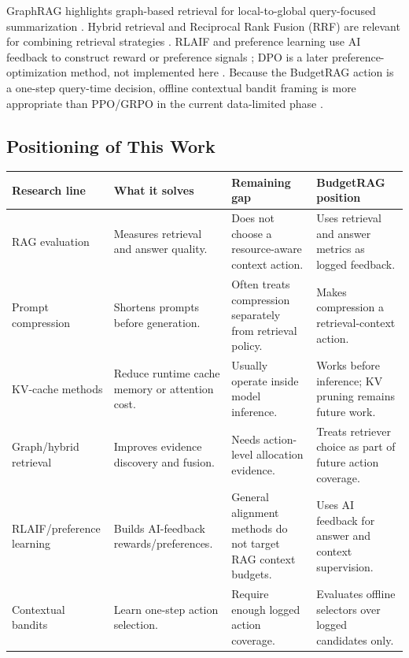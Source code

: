 GraphRAG highlights graph-based retrieval for local-to-global query-focused summarization \cite{edge2024graphrag}. Hybrid retrieval and Reciprocal Rank Fusion (RRF) are relevant for combining retrieval strategies \cite{cormack2009rrf}. RLAIF and preference learning use AI feedback to construct reward or preference signals \cite{bai2022constitutional}; DPO is a later preference-optimization method, not implemented here \cite{rafailov2023dpo}. Because the BudgetRAG action is a one-step query-time decision, offline contextual bandit framing is more appropriate than PPO/GRPO in the current data-limited phase \cite{li2010contextualbandit}.

\subsection{Positioning of This Work}

\begin{center}
\small
\begin{tabular}{>{\raggedright\arraybackslash}p{3.1cm} >{\raggedright\arraybackslash}p{3.2cm} >{\raggedright\arraybackslash}p{3.1cm} >{\raggedright\arraybackslash}p{3.8cm}}
\toprule
Research line & What it solves & Remaining gap & BudgetRAG position \\
\midrule
RAG evaluation & Measures retrieval and answer quality. & Does not choose a resource-aware context action. & Uses retrieval and answer metrics as logged feedback. \\
Prompt compression & Shortens prompts before generation. & Often treats compression separately from retrieval policy. & Makes compression a retrieval-context action. \\
KV-cache methods & Reduce runtime cache memory or attention cost. & Usually operate inside model inference. & Works before inference; KV pruning remains future work. \\
Graph/hybrid retrieval & Improves evidence discovery and fusion. & Needs action-level allocation evidence. & Treats retriever choice as part of future action coverage. \\
RLAIF/preference learning & Builds AI-feedback rewards/preferences. & General alignment methods do not target RAG context budgets. & Uses AI feedback for answer and context supervision. \\
Contextual bandits & Learn one-step action selection. & Require enough logged action coverage. & Evaluates offline selectors over logged candidates only. \\
\bottomrule
\end{tabular}
\end{center}
